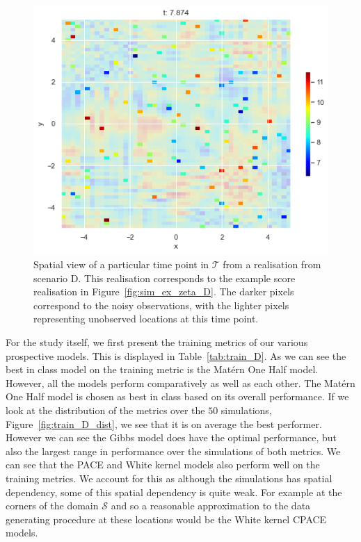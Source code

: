 \begin{figure}
	\centering
	\includegraphics[width=\textwidth]{sim_example_D}
	\caption[A spatial view of a particular time point in $\mathcal{T}$ from a realisation from scenario D.]{Spatial view of a particular time point in $\mathcal{T}$ from a realisation from scenario D. This realisation corresponds to the example score realisation in Figure~\ref{fig:sim_ex_zeta_D}. The darker pixels correspond to the noisy observations, with the lighter pixels representing unobserved locations at this time point.}
	\label{fig:sim_example_D}
\end{figure}

For the study itself, we first present the training metrics of our various prospective models. 
This is displayed in Table~\ref{tab:train_D}.
As we can see the best in class model on the training metric is the Mat\'ern One Half model. 
However, all the models perform comparatively as well as each other.
The Mat\'ern One Half model is chosen as best in class based on its overall performance.
If we look at the distribution of the metrics over the $50$ simulations, Figure~\ref{fig:train_D_dist}, we see that it is on average the best performer. 
However we can see the Gibbs model  does have the optimal performance, but also the largest range in performance over the simulations of both metrics.
We can see that the PACE and White kernel models also perform well on the training metrics.
We account for this as although the simulations has spatial dependency, some of this spatial dependency is quite weak.
For example at the corners of the domain $\mathcal{S}$ and so a reasonable approximation to the data generating procedure at these locations would be the White kernel CPACE models.


